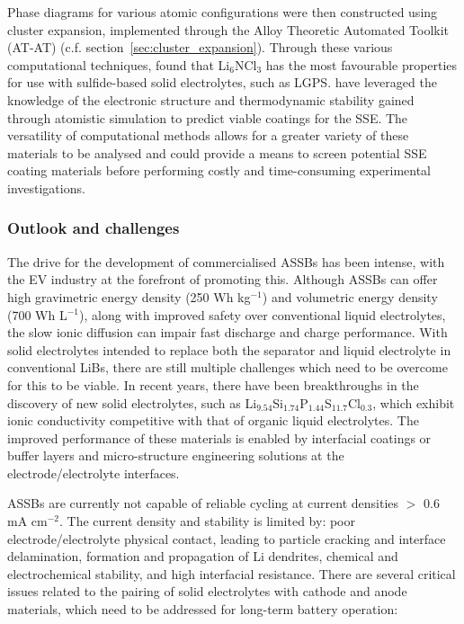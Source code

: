 \documentclass[../main.tex]{subfiles}
\begin{document}
Phase diagrams for various atomic configurations were then constructed using cluster expansion, implemented through the Alloy Theoretic Automated Toolkit (AT-AT) (c.f. section~\ref{sec:cluster_expansion}).\cite{Hart2008, VandeWalle2002} Through these various computational techniques, \citeauthor{Sang2020} found that Li$_6$NCl$_3$ has the most favourable properties for use with sulfide-based solid electrolytes, such as LGPS.\cite{Sang2020}  \citeauthor{Tian2018}  \citeauthor{Sang2020} have leveraged the knowledge of the electronic structure and thermodynamic stability gained through atomistic simulation to predict viable coatings for the SSE. The versatility of computational methods allows for a greater variety of these materials to be analysed and could provide a means to screen potential SSE coating materials before performing costly and time-consuming experimental investigations.\cite{sang2021rev} 

\subsubsection{Outlook and challenges}
\label{sec:solids_outlook}
The drive for the development of commercialised ASSBs has been intense, with the EV industry at the forefront of promoting this.\cite{Woods_2021} Although ASSBs can offer high gravimetric energy density (250 Wh kg$^{-1}$) and volumetric energy density (700 Wh L$^{-1}$), along with improved safety over conventional liquid electrolytes, the slow ionic diffusion can impair fast discharge and charge performance. With solid electrolytes intended to replace both the separator and liquid electrolyte in conventional LiBs,\cite{schnell2020solid} there are still multiple challenges which need to be overcome for this to be viable. In recent years, there have been breakthroughs in the discovery of new solid electrolytes, such as Li$_{9.54}$Si$_{1.74}$P$_{1.44}$S$_{11.7}$Cl$_{0.3}$,\cite{kato2016high} which exhibit ionic conductivity competitive with that of organic liquid electrolytes. The improved performance of these materials is enabled by interfacial coatings or buffer layers and micro-structure engineering solutions at the electrode/electrolyte interfaces.\cite{kim2021solid}

ASSBs are currently not capable of reliable cycling at current densities $>$ 0.6 mA cm$^{-2}$\cite{famprikis_fundamentals_2019, Albertus2018}. The current density and stability is limited by: poor electrode/electrolyte physical contact, leading to particle cracking and interface delamination, formation and propagation of Li dendrites, chemical and electrochemical stability, and high interfacial resistance.\cite{famprikis_fundamentals_2019} There are several critical issues related to the pairing of solid electrolytes with cathode and anode materials, which need to be addressed for long-term battery operation: 
\end{document}

